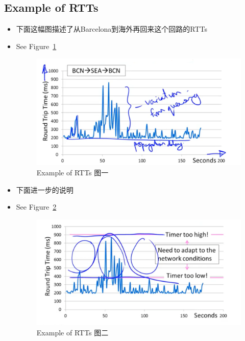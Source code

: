 \documentclass[12pt]{ctexart}   %
\begin{document}
	\subsection{Example of RTTs}
	\begin{itemize}
		\item 下面这幅图描述了从Barcelona到海外再回来这个回路的RTTs
		\item See Figure~\ref{fig:6-7-3}
		  
		 \begin{figure}[h!] %
		\centering
		 \includegraphics[scale=0.7]{images/6-7-3}
		\caption{ Example of RTTs 图一 }
		 \label{fig:6-7-3}
		 \end{figure}
		
		\item 下面进一步的说明
		\item See Figure~\ref{fig:6-7-4}
		  
		 \begin{figure}[h!] %
		\centering
		 \includegraphics[scale=0.7]{images/6-7-4}
		\caption{ Example of RTTs 图二 }
		 \label{fig:6-7-4}
		 \end{figure}
	\end{itemize}
	
\end{document}

